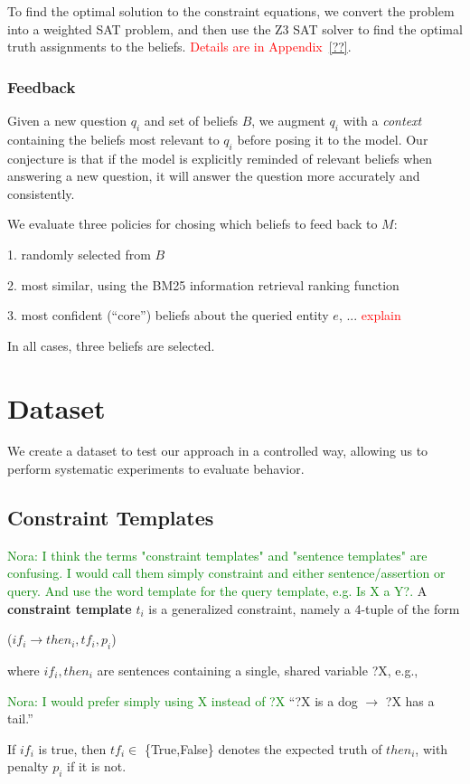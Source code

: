 \documentclass[11pt]{article}
\newcommand{\nk}[1]{\textcolor{green}{Nora: #1}}
\newcommand{\red}[1]{\textcolor{red}{#1}}
\newenvironment{myquote}{                   %
  \parskip 0mm \begin{quoting}[vskip=0mm,leftmargin=2mm]}{
\end{quoting}}
\newenvironment{enu}{                   %
     \parskip 0cm \begin{list}{}{\parsep 0cm \itemsep 0cm \topsep 0cm}}{
       \end{list}} %
\begin{document}
To find the optimal solution to the constraint equations, we convert the problem into a weighted SAT problem,
and then use the Z3 SAT solver to find the optimal truth assignments to the beliefs. \red{Details are in
Appendix~\ref{??}}.

\subsubsection{Feedback}

Given a new question $q_i$ and set of beliefs $B$, we augment
$q_i$ with a {\it context} containing the beliefs most relevant to $q_i$
before posing it to the model. Our conjecture is that if the 
model is explicitly reminded of relevant beliefs when answering a new question,
it will answer the question more accurately and consistently.

We evaluate three policies for chosing which beliefs to feed back to $M$:
\begin{enu}
\item[1.] randomly selected from $B$
\item[2.] most similar, using the BM25 information retrieval ranking function \cite{bm25}
\item[3.] most confident (``core'') beliefs about the queried entity $e$, ... \red{explain}
\end{enu}
In all cases, three beliefs are selected.

\section{Dataset}

We create a dataset to test our approach in a controlled way, allowing us to perform systematic experiments to evaluate behavior.

\subsection{Constraint Templates}
\nk{I think the terms "constraint templates" and "sentence templates" are confusing. I would call them simply constraint and either sentence/assertion or query. And use the word template for the query template, e.g. Is X a Y?.}
A {\bf constraint template} $t_i$ is a generalized constraint, namely a 4-tuple of the form
\begin{myquote} \centering
($if_i \rightarrow then_i, tf_i, p_i$)
\end{myquote} 
where $if_i, then_i$ are sentences containing a single, shared variable ?X, e.g.,
\begin{myquote} \centering
\nk{I would prefer simply using X instead of ?X}
``?X is a dog $\rightarrow$ ?X has a tail.''
\end{myquote}
If $if_i$ is true, then $tf_i \in$ \{True,False\} denotes the expected truth of $then_i$, 
with penalty $p_i$ if it is not.
\end{document}
